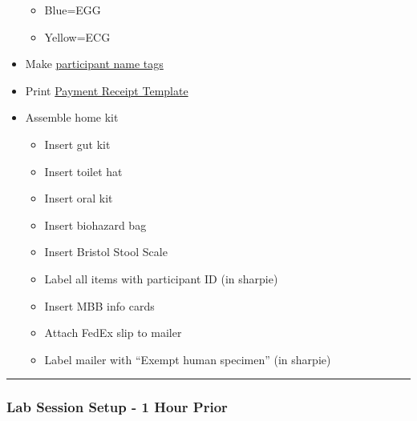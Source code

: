 \documentclass[]{book}
\providecommand{\tightlist}{%
  \setlength{\itemsep}{0pt}\setlength{\parskip}{0pt}}
\begin{document}
\begin{itemize}
  \begin{itemize}
  \tightlist
  \item
    Blue=EGG
  \item
    Yellow=ECG
  \end{itemize}
\item
  Make \href{https://app.box.com/file/630320259767}{participant name tags}
\item
  Print \href{https://app.box.com/file/630326568873}{Payment Receipt Template}
\item
  Assemble home kit

  \begin{itemize}
  \tightlist
  \item
    Insert gut kit
  \item
    Insert toilet hat
  \item
    Insert oral kit
  \item
    Insert biohazard bag
  \item
    Insert Bristol Stool Scale
  \item
    Label all items with participant ID (in sharpie)
  \item
    Insert MBB info cards
  \item
    Attach FedEx slip to mailer
  \item
    Label mailer with ``Exempt human specimen'' (in sharpie)
  \end{itemize}
\end{itemize}

\begin{center}\rule{0.5\linewidth}{0.5pt}\end{center}

\hypertarget{lab-session-setup---1-hour-prior}{%
\subsubsection{Lab Session Setup - 1 Hour Prior}\label{lab-session-setup---1-hour-prior}}
\end{document}
